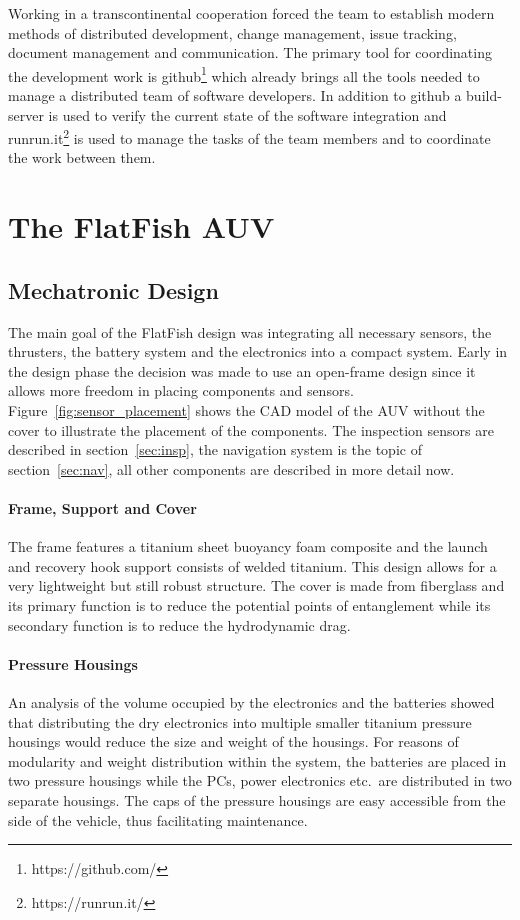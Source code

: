 \documentclass[conference]{IEEEtran}
\begin{document}
Working in a transcontinental cooperation forced the team to establish modern methods of
distributed development, change management, issue tracking, document management and
communication. The primary tool for coordinating the development work is
github\footnote{https://github.com/} which already brings all the tools needed to manage a
distributed team of software developers. In addition to github a build-server is used to
verify the current state of the software integration and
runrun.it\footnote{https://runrun.it/} is used to manage the tasks of the team members and
to coordinate the work between them. 

\section{The FlatFish AUV}

\subsection{Mechatronic Design}

The main goal of the FlatFish design was integrating all necessary sensors, the 
thrusters, the battery system and the electronics into a compact system. Early in the design 
phase the decision was made to use an open-frame design since it allows more freedom in 
placing components and sensors. Figure~\ref{fig:sensor_placement} shows the CAD model 
of the AUV without the cover to illustrate the placement of the components. The inspection 
sensors are described in section~\ref{sec:insp}, the navigation system is the topic of 
section~\ref{sec:nav}, all other components are described in more detail now.

\paragraph{\textbf{Frame, Support and Cover}} The frame features a titanium sheet
buoyancy foam composite and the launch and recovery hook support consists of welded titanium. 
This design allows for a very lightweight but still robust structure. The cover is made from 
fiberglass and its primary function is to reduce the potential points of entanglement while its 
secondary function is to reduce the hydrodynamic drag.

\paragraph{\textbf{Pressure Housings}} An analysis of the volume occupied by the electronics 
and the batteries showed that distributing the dry electronics into multiple smaller titanium 
pressure housings would reduce the size and weight of the housings. For 
reasons of modularity and weight distribution within the system, the batteries are placed in two 
pressure housings while the PCs, power electronics etc.~are 
distributed in two separate housings. The caps of the pressure housings are easy accessible from the 
side of the vehicle, thus facilitating maintenance.
\end{document}
